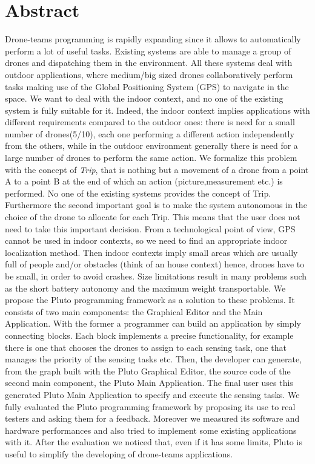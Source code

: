 \chapter*{Abstract}


Drone-teams programming is rapidly expanding since it allows to automatically perform a lot of useful tasks.
Existing systems are able to manage a group of drones and dispatching them in the environment. 
All these systems deal with outdoor applications, where medium/big sized drones collaboratively perform tasks making use of the Global Positioning System (GPS) to navigate in the space.
We want to deal with the indoor context, and no one of the existing system is fully suitable for it.
Indeed, the indoor context implies applications with different requirements compared to the outdoor ones:
there is need for a small number of drones(5/10), each one performing a different action independently from the others, while in the outdoor environment generally there is need for a large number of drones to perform the same action.
We formalize this problem with the concept of \textit{Trip}, that is nothing but a movement of a drone from a point A to a point B at the end of which an action (picture,measurement etc.) is performed. 
No one of the existing systems provides the concept of Trip.
Furthermore the second important goal is to make the system autonomous in the choice of the drone to allocate for each Trip. 
This means that the user does not need to take this important decision.
From a technological point of view, GPS cannot be used in indoor contexts, so we need to find an appropriate indoor localization method.
Then indoor contexts imply small areas which are usually full of people and/or obstacles (think of an house context) hence, drones have to be small, in order to avoid crashes.
Size limitations result in many problems such as the short battery autonomy and the maximum weight transportable.
We propose the Pluto programming framework as a solution to these problems. 
It consists of two main components: the Graphical Editor and the Main Application.
With the former a programmer can build an application by simply connecting blocks.
Each block implements a precise functionality, for example there is one that chooses the drones to assign to each sensing task, one that manages the priority of the sensing tasks etc.
Then, the developer can generate, from the graph built with the Pluto Graphical Editor, the source code of the second main component, the Pluto Main Application.
The final user uses this generated Pluto Main Application to specify and execute the sensing tasks.
We fully evaluated the Pluto programming framework by proposing its use to real testers and asking them for a feedback. 
Moreover we measured its software and hardware performances and also tried to implement some existing applications with it.
After the evaluation we noticed that, even if it has some limits, Pluto is useful to simplify the developing of drone-teams applications.



